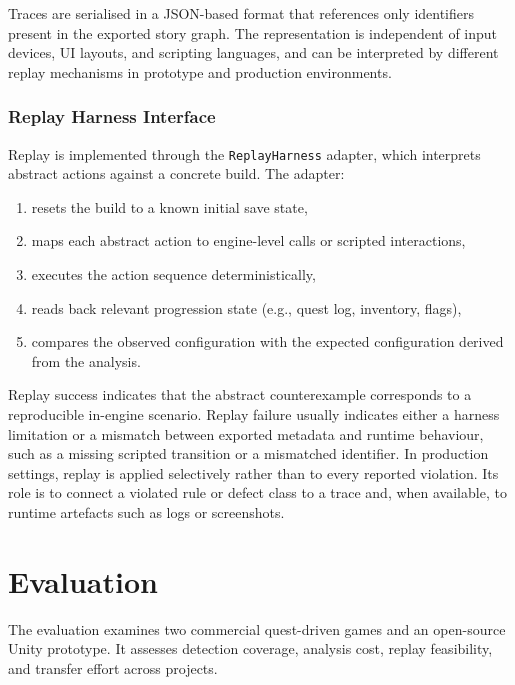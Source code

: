 \documentclass[conference]{IEEEtran}
\begin{document}
Traces are serialised in a JSON-based format that references only
identifiers present in the exported story graph. The representation is
independent of input devices, UI layouts, and scripting languages, and
can be interpreted by different replay mechanisms in prototype and
production environments.

\subsubsection{Replay Harness Interface}

Replay is implemented through the \texttt{ReplayHarness} adapter, which
interprets abstract actions against a concrete build. The adapter:

\begin{enumerate}[leftmargin=1.3em]
  \item resets the build to a known initial save state,
  \item maps each abstract action to engine-level calls or scripted
        interactions,
  \item executes the action sequence deterministically,
  \item reads back relevant progression state (e.g., quest log,
        inventory, flags),
  \item compares the observed configuration with the expected
        configuration derived from the analysis.
\end{enumerate}

Replay success indicates that the abstract counterexample corresponds to
a reproducible in-engine scenario. Replay failure usually indicates either
a harness limitation or a mismatch between exported metadata and runtime
behaviour, such as a missing scripted transition or a mismatched
identifier. In production settings, replay is applied selectively rather than to every
reported violation. Its role is to connect a violated rule or defect class
to a trace and, when available, to runtime artefacts
such as logs or screenshots.

\section{Evaluation}
\label{sec:evaluation}

The evaluation examines two commercial quest-driven games and an
open-source Unity prototype. It assesses detection coverage, analysis
cost, replay feasibility, and transfer effort across projects.
\end{document}
